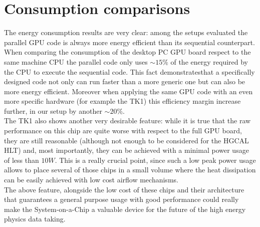 \section{Consumption comparisons}
The energy consumption results are very clear: among the setups evaluated the parallel GPU code is always more energy efficient than its sequential counterpart. When comparing the consumption of the desktop PC GPU board respect to the same machine CPU the parallel code only uses $\sim15\%$ of the energy required by the CPU to execute the sequential code. This fact demonstratesthat a specifically designed code not only can run faster than a more generic one but can also be more energy efficient. Moreover when applying the same GPU code with an even more specific hardware (for example the TK1) this efficiency margin increase further, in our setup by another $\sim20\%$.\\
The TK1 also shows another very desirable feature: while it is true that the raw performance on this chip are quite worse with respect to the full GPU board, they are still reasonable (although not enough to be considered for the HGCAL HLT) and, most importantly, they can be achieved with a minimal power usage of less than $10 \unit{W}$. This is a really crucial point, since such a low peak power usage allows to place several of those chips in a small volume where the heat dissipation can be easily achieved with low cost airflow mechanisms.\\
The above feature, alongside the low cost of these chips and their architecture that guarantees a general purpose usage with good performance could really make the System-on-a-Chip a valuable device for the future of the high energy physics data taking.
